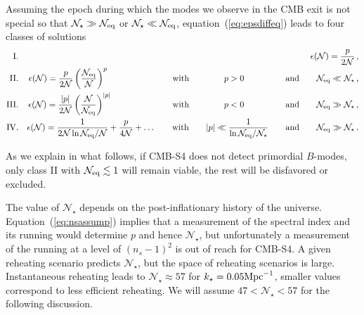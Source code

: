 Assuming the epoch during which the modes we observe in the CMB exit is not special so that $\mathcal{N}_\star\gg\mathcal{N}_{\rm eq}$ or $\mathcal{N}_\star\ll\mathcal{N}_{\rm eq}$, equation~(\ref{eq:epsdiffeq}) leads to four classes of solutions
\begin{eqnarray}
{\rm I.}&&\epsilon(\mathcal{N})=\frac{p}{2\mathcal{N}}\,,\label{eq:classI}\\
{\rm II.}&&\epsilon(\mathcal{N})=\frac{p}{2\mathcal{N}}\left(\frac{\mathcal{N}_{\rm eq}}{\mathcal{N}}\right)^p\hspace{1.92cm}\qquad{\rm with}\qquad \hspace{7.3mm}p>0 \hspace{1.0cm}\qquad{\rm and}\qquad\mathcal{N}_{\rm eq}\ll\mathcal{N}_\star\,,\label{eq:classII}\\
{\rm III.}&&\epsilon(\mathcal{N})=\frac{|p|}{2\mathcal{N}}\left(\frac{\mathcal{N}}{\mathcal{N}_{\rm eq}}\right)^{|p|}\hspace{1.77cm}\qquad{\rm with}\qquad \hspace{7.3mm}p<0 \hspace{1.0cm}\qquad{\rm and}\qquad\mathcal{N}_{\rm eq}\gg\mathcal{N}_\star\,,\label{eq:classIII}\\
{\rm IV.}&&\epsilon(\mathcal{N})=\frac{1}{2\mathcal{N}\ln\mathcal{N}_{\rm eq}/\mathcal{N}}+\frac{p}{4\mathcal{N}}+\dots\qquad{\rm with}\qquad |p|\ll\frac{1}{\ln\mathcal{N}_{\rm eq}/\mathcal{N}_\star}\qquad{\rm and}\qquad \mathcal{N}_{\rm eq}\gg\mathcal{N}_\star\,.\label{eq:classIV}
\end{eqnarray}

As we explain in what follows, if CMB-S4 does not detect primordial $B$-modes, only class II with $\mathcal{N}_{\rm eq}\lesssim 1$ will remain viable, the rest will be disfavored or excluded.

The value of $\mathcal{N}_\star$ depends on the post-inflationary history of the universe. Equation~(\ref{eq:nsassump}) implies that a measurement of the spectral index and its running would determine $p$ and hence $\mathcal{N}_\star$, but unfortunately a measurement of the running at a level of $(n_s-1)^2$ is out of reach for CMB-S4. A given reheating scenario predicts $\mathcal{N}_\star$, but the space of reheating scenarios is large. Instantaneous reheating leads to $\mathcal{N}_\star\approx 57$ for $k_\star=0.05 {\rm Mpc}^{-1}$, smaller values correspond to less efficient reheating. We will assume $47<\mathcal{N}_\star<57$ for the following discussion. 

